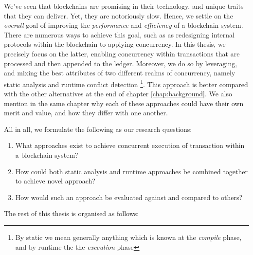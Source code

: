 We've seen that blockchains are promising in their technology, and unique traits that they can deliver. Yet, they are notoriously slow. Hence, we settle on the \textit{overall} goal of improving the
\textit{performance} and \textit{efficiency} of a blockchain system. There are numerous ways to
achieve this goal, such as as redesigning internal protocols within the blockchain to applying concurrency. In this
thesis, we precisely focus on the latter, enabling concurrency within transactions that are processed
and then appended to the ledger. Moreover, we do so by leveraging, and mixing the best attributes of two different realms of concurrency, namely static analysis and runtime conflict detection \footnote{By static we mean generally anything which is known at the \textit{compile} phase, and by runtime the the \textit{execution} phase}. This approach is better compared with the other alternatives at the
end of chapter \ref{chap:background}. We also mention in the same chapter why each of these
approaches could have their own merit and value, and how they differ with one another.

 All in all, we formulate the following as our research questions:

 \begin{enumerate}
     \item What approaches exist to achieve concurrent execution of transaction within a blockchain system?
	 \item How could both static analysis and runtime approaches be combined together to achieve novel approach?
	 \item How would such an approach be evaluated against and compared to others?
 \end{enumerate}

The rest of this thesis is organised as follows: 

